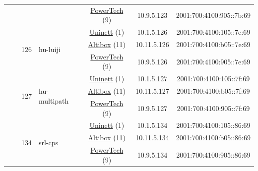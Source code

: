 \begin{small}
\begin{center}
\begin{longtable}{|c|c|c|c|c|c|c|c|}
  &  &  &  & \multicolumn{2}{|c|}{\tiny{\href{http://www.powertech.no}{PowerTech} (9)}} & \tiny{10.9.5.123} & \tiny{2001:700:4100:905::7b:69} \\* \cline{3-3}\cline{4-4}\cline{5-5}\cline{6-6}\cline{7-7}\cline{8-8}
  &  & \multirow{3}{*}{\tiny{126}} & \multicolumn{1}{|l|}{\multirow{3}{*}{\tiny{hu-luiji}}} & \multicolumn{2}{|c|}{\tiny{\href{https://www.uninett.no}{Uninett} (1)}} & \tiny{10.1.5.126} & \tiny{2001:700:4100:105::7e:69} \\* \cline{5-5}\cline{6-6}\cline{7-7}\cline{8-8}
  &  &  &  & \multicolumn{2}{|c|}{\tiny{\href{https://www.altibox.no}{Altibox} (11)}} & \tiny{10.11.5.126} & \tiny{2001:700:4100:b05::7e:69} \\* \cline{5-5}\cline{6-6}\cline{7-7}\cline{8-8}
  &  &  &  & \multicolumn{2}{|c|}{\tiny{\href{http://www.powertech.no}{PowerTech} (9)}} & \tiny{10.9.5.126} & \tiny{2001:700:4100:905::7e:69} \\* \cline{3-3}\cline{4-4}\cline{5-5}\cline{6-6}\cline{7-7}\cline{8-8}
  &  & \multirow{3}{*}{\tiny{127}} & \multicolumn{1}{|l|}{\multirow{3}{*}{\tiny{hu-multipath}}} & \multicolumn{2}{|c|}{\tiny{\href{https://www.uninett.no}{Uninett} (1)}} & \tiny{10.1.5.127} & \tiny{2001:700:4100:105::7f:69} \\* \cline{5-5}\cline{6-6}\cline{7-7}\cline{8-8}
  &  &  &  & \multicolumn{2}{|c|}{\tiny{\href{https://www.altibox.no}{Altibox} (11)}} & \tiny{10.11.5.127} & \tiny{2001:700:4100:b05::7f:69} \\* \cline{5-5}\cline{6-6}\cline{7-7}\cline{8-8}
  &  &  &  & \multicolumn{2}{|c|}{\tiny{\href{http://www.powertech.no}{PowerTech} (9)}} & \tiny{10.9.5.127} & \tiny{2001:700:4100:905::7f:69} \\* \cline{3-3}\cline{4-4}\cline{5-5}\cline{6-6}\cline{7-7}\cline{8-8}
  &  & \multirow{3}{*}{\tiny{134}} & \multicolumn{1}{|l|}{\multirow{3}{*}{\tiny{srl-cps}}} & \multicolumn{2}{|c|}{\tiny{\href{https://www.uninett.no}{Uninett} (1)}} & \tiny{10.1.5.134} & \tiny{2001:700:4100:105::86:69} \\* \cline{5-5}\cline{6-6}\cline{7-7}\cline{8-8}
  &  &  &  & \multicolumn{2}{|c|}{\tiny{\href{https://www.altibox.no}{Altibox} (11)}} & \tiny{10.11.5.134} & \tiny{2001:700:4100:b05::86:69} \\* \cline{5-5}\cline{6-6}\cline{7-7}\cline{8-8}
  &  &  &  & \multicolumn{2}{|c|}{\tiny{\href{http://www.powertech.no}{PowerTech} (9)}} & \tiny{10.9.5.134} & \tiny{2001:700:4100:905::86:69} \\* \cline{3-3}\cline{4-4}\cline{5-5}\cline{6-6}\cline{7-7}\cline{8-8}

\end{longtable}
\end{center}
\end{small}
